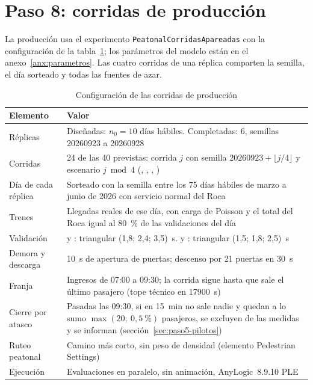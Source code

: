\section{Paso 8: corridas de producción}
\label{sec:paso8-produccion}

La producción usa el experimento \texttt{PeatonalCorridasApareadas} con la configuración de la
tabla~\ref{tab:produccion}; los parámetros del modelo están en el anexo~\ref{anx:parametros}. Las cuatro
corridas de una réplica comparten la semilla, el día sorteado y todas las fuentes de azar.

\begin{table}[H]
\centering
\caption{Configuración de las corridas de producción}
\label{tab:produccion}
\small
\begin{tabularx}{\textwidth}{@{}>{\raggedright\arraybackslash}p{4.2cm} X@{}}
\toprule
Elemento & Valor \\
\midrule
Réplicas & Diseñadas: $n_0 = 10$ días hábiles. Completadas: 6, semillas \num{20260923} a \num{20260928} \\
Corridas & 24 de las 40 previstas: corrida $j$ con semilla $20260923 + \lfloor j/4 \rfloor$ y escenario $j \bmod 4$ (\EO{}, \EI{}, \ET{}, \EIT{}) \\
Día de cada réplica & Sorteado con la semilla entre los 75 días hábiles de marzo a junio de 2026 con servicio normal del Roca \\
Trenes & Llegadas reales de ese día, con carga de Poisson y el total del Roca igual al 80~\% de las validaciones del día \\
Validación & \EO{} y \EI{}: triangular (1,8; 2,4; 3,5)~s. \ET{} y \EIT{}: triangular (1,5; 1,8; 2,5)~s \\
Demora y descarga & 10~s de apertura de puertas; descenso por 21 puertas en 30~s \\
Franja & Ingresos de 07:00 a 09:30; la corrida sigue hasta que sale el último pasajero (tope técnico en \num{17900}~s) \\
Cierre por atasco & Pasadas las 09:30, si en 15~min no sale nadie y quedan a lo sumo $\max(20;\ 0{,}5~\%)$ pasajeros, se excluyen de las medidas y se informan (sección~\ref{sec:paso5-pilotos}) \\
Ruteo peatonal & Camino más corto, sin peso de densidad (elemento Pedestrian Settings) \\
Ejecución & Evaluaciones en paralelo, sin animación, AnyLogic~8.9.10 PLE \\
\bottomrule
\end{tabularx}
\end{table}

